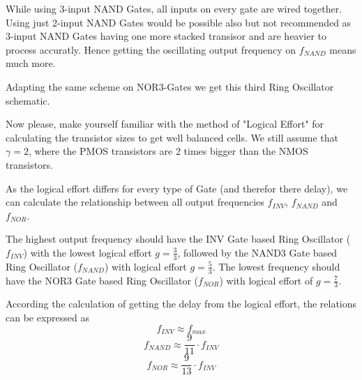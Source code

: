 

While using 3-input NAND Gates, all inputs on every gate are wired together. Using just 2-input NAND Gates would be possible also but not recommended as 3-input NAND Gates having one more stacked transisor and are heavier to process accuratly. Hence getting the oscillating output frequency on $f_{NAND}$ means much more.

Adapting the same scheme on NOR3-Gates we get this third Ring Oscillator schematic.



Now please, make yourself familiar with the method of "Logical Effort" for calculating the transistor sizes to get well balanced cells. We still assume that $\gamma = 2$, where the PMOS transistors are 2 times bigger than the NMOS transistors.

As the logical effort differs for every type of Gate (and therefor there delay), we can calculate the relationship between all output frequencies $f_{INV}$, $f_{NAND}$ and $f_{NOR}$.

The highest output frequency should have the INV Gate based Ring Oscillator ($f_{INV}$) with the lowest logical effort $g = \frac{3}{3}$, followed by the NAND3 Gate based Ring Oscillator ($f_{NAND}$) with logical effort $g = \frac{5}{3}$. The lowest frequency should have the NOR3 Gate based Ring Oscillator ($f_{NOR}$) with logical effort of $g = \frac{7}{3}$.

According the calculation of getting the delay from the logical effort, the relations can be expressed as
%
\begin{equation}
    f_{INV} \approx f_{max}
\end{equation}
%
\begin{equation}
    f_{NAND} \approx \frac{9}{11} \cdot f_{INV}
\end{equation}
%
\begin{equation}
    f_{NOR} \approx \frac{9}{13} \cdot f_{INV}
\end{equation}

\clearpage
